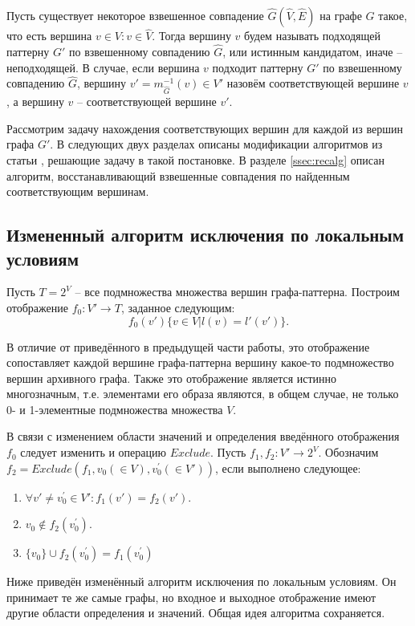 Пусть существует некоторое взвешенное совпадение  $\widehat{G}(\widehat{V}, \widehat{E})$ на графе $G$ такое, что есть вершина $v \in V : v \in \widehat{V}$. Тогда вершину $v$ будем называть подходящей паттерну $G'$ по взвешенному совпадению $\widehat{G}$, или истинным кандидатом, иначе -- неподходящей. В случае, если вершина $v$ подходит паттерну $G'$ по взвешенному совпадению $\widehat{G}$, вершину $v' = m_{\widehat{G}}^{-1}(v) \in  V'$ назовём соответствующей вершине $v$, а вершину $v$ -- соответствующей вершине $v'$.

Рассмотрим задачу нахождения соответствующих вершин для каждой из вершин графа $G'$. В следующих двух разделах описаны модификации алгоритмов из статьи \cite{patmat}, решающие задачу в такой постановке. В разделе \ref{ssec:recalg} описан алгоритм, восстанавливающий взвешенные совпадения по найденным соответствующим вершинам.

\subsection{Измененный алгоритм исключения по локальным условиям}

Пусть $T = 2^{V}$ -- все подмножества множества вершин графа-паттерна. Построим отображение $f_0 : V' \to T$, заданное следующим:
\begin{equation}
f_0(v') \{v \in V | l(v) = l'(v')\} .
\end{equation}

В отличие от приведённого в предыдущей части работы, это отображение сопоставляет каждой вершине графа-паттерна вершину какое-то подмножество вершин архивного графа. Также это отображение является истинно многозначным, т.е. элементами его образа являются, в общем случае, не только 0- и 1-элементные подмножества множества $V$. 

В связи с изменением области значений и определения введённого отображения $f_0$ следует изменить и операцию $Exclude$. Пусть $f_1, f_2 : V' \to 2^{V}$. Обозначим $f_2 = Exclude(f_1, v_0 (\in V), v^{\prime}_0 (\in V'))$, если выполнено следующее:
\begin{enumerate}
	\item $\forall v' \ne v^{\prime}_0 \in V': f_1(v') = f_2(v')$.
	\item $v_0 \notin f_2(v^{\prime}_0)$.
	\item $\{v_0\} \cup f_2(v^{\prime}_0) = f_1(v^{\prime}_0)$
\end{enumerate}

Ниже приведён изменённый алгоритм исключения по локальным условиям. Он принимает те же самые графы, но входное и выходное отображение имеют другие области определения и значений. Общая идея алгоритма сохраняется.

